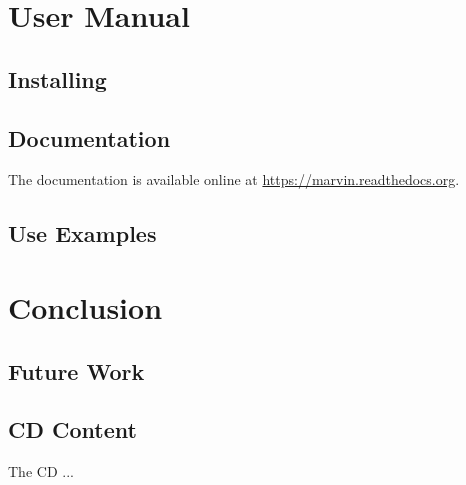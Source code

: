 \documentclass{report}
\begin{document}
\chapter{User Manual}
\label{manual}

\section{Installing}


\section{Documentation}

The documentation is available online at \url{https://marvin.readthedocs.org}.

\section{Use Examples}

\chapter{Conclusion}
\label{conclusion}

\section{Future Work}

\begin{appendices}
\chapter{CD Content}

The CD ...

\end{appendices}



\end{document}
